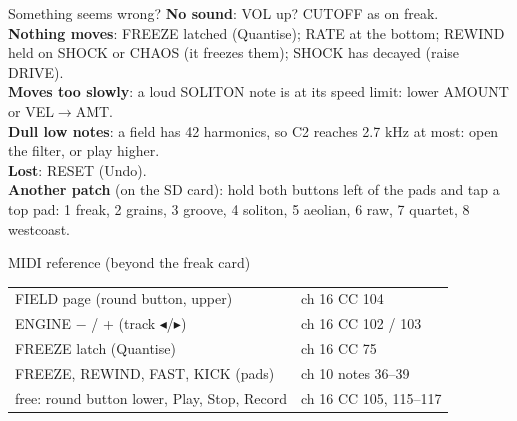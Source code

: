 \documentclass{article}
\begin{document}
\begin{minipage}[t]{128mm}
\begin{card}{Something seems wrong?}
\fontsize{7.5}{9.2}\selectfont
\textbf{No sound}: VOL up? CUTOFF as on freak.\\[0.4mm]
\textbf{Nothing moves}: FREEZE latched (Quantise); RATE at the bottom; REWIND held on SHOCK or CHAOS (it freezes them);
SHOCK has decayed (raise DRIVE).\\[0.4mm]
\textbf{Moves too slowly}: a loud SOLITON note is at its speed limit: lower AMOUNT or VEL\(\to\)AMT.\\[0.4mm]
\textbf{Dull low notes}: a field has 42 harmonics, so C2 reaches 2.7 kHz at most: open the filter, or play higher.\\[0.4mm]
\textbf{Lost}: RESET (Undo).\\[0.4mm]
\textbf{Another patch} (on the SD card): hold both buttons left of the pads and tap a top pad: 1 freak, 2 grains, 3 groove, 4 soliton, 5 aeolian, 6 raw, 7 quartet, 8 westcoast.
\end{card}

\begin{card}{MIDI reference (beyond the freak card)}
\fontsize{7.4}{9.0}\selectfont
\setlength{\tabcolsep}{3pt}
\begin{tabular}{@{}l l@{}}
FIELD page (round button, upper) & ch 16 CC 104 \\
ENGINE \(-\) / + (track \(\blacktriangleleft\)/\(\blacktriangleright\)) & ch 16 CC 102 / 103 \\
FREEZE latch (Quantise) & ch 16 CC 75 \\
FREEZE, REWIND, FAST, KICK (pads) & ch 10 notes 36--39 \\
free: round button lower, Play, Stop, Record & ch 16 CC 105, 115--117 \\
\end{tabular}
\end{card}
\end{minipage}
\end{document}
